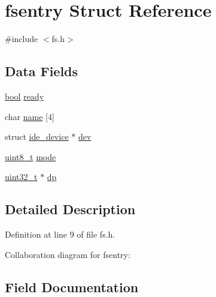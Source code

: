 \hypertarget{a00272}{}\section{fsentry Struct Reference}
\label{a00272}


{\ttfamily \#include $<$fs.\+h$>$}

\subsection*{Data Fields}
\begin{DoxyCompactItemize}
\item 
\hyperlink{a00140_af6a258d8f3ee5206d682d799316314b1_af6a258d8f3ee5206d682d799316314b1}{bool} \hyperlink{a00272_a284522ed97fe1eeebd0fcc039b2ea00a_a284522ed97fe1eeebd0fcc039b2ea00a}{ready}
\item 
char \hyperlink{a00272_a9c5a4f5b02eb2c9e9e797f79dc99028a_a9c5a4f5b02eb2c9e9e797f79dc99028a}{name} \mbox{[}4\mbox{]}
\item 
struct \hyperlink{a00224}{ide\+\_\+device} $\ast$ \hyperlink{a00272_aaea66ea744fa50f1c54666033884d8d2_aaea66ea744fa50f1c54666033884d8d2}{dev}
\item 
\hyperlink{a00140_aba7bc1797add20fe3efdf37ced1182c5_aba7bc1797add20fe3efdf37ced1182c5}{uint8\+\_\+t} \hyperlink{a00272_a6e71712bc3c51c21dc3362334937e4d7_a6e71712bc3c51c21dc3362334937e4d7}{mode}
\item 
\hyperlink{a00140_a435d1572bf3f880d55459d9805097f62_a435d1572bf3f880d55459d9805097f62}{uint32\+\_\+t} $\ast$ \hyperlink{a00272_ae1d22893563b8753e29fef01f0782ba5_ae1d22893563b8753e29fef01f0782ba5}{dp}
\end{DoxyCompactItemize}


\subsection{Detailed Description}


Definition at line 9 of file fs.\+h.



Collaboration diagram for fsentry\+:


\subsection{Field Documentation}
\mbox{\label{a00272_aaea66ea744fa50f1c54666033884d8d2_aaea66ea744fa50f1c54666033884d8d2}} 
